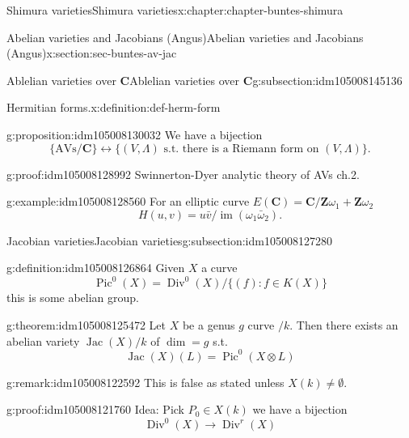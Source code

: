 \documentclass[oneside,10pt,]{book}
\numberwithin{equation}{section}
\newcommand{\ZZ}{\mathbf{Z}}
\newcommand{\CC}{\mathbf{C}}
\DeclareMathOperator{\divisors}{Div}
\DeclareMathOperator{\Pic}{Pic}
\DeclareMathOperator{\Jac}{Jac}
\DeclareMathOperator{\im}{im}
\begin{document}
\begin{chapterptx}{Shimura varieties}{}{Shimura varieties}{}{}{x:chapter:chapter-buntes-shimura}
\begin{sectionptx}{Abelian varieties and Jacobians (Angus)}{}{Abelian varieties and Jacobians (Angus)}{}{}{x:section:sec-buntes-av-jac}
\begin{subsectionptx}{Ablelian varieties over \(\CC\)}{}{Ablelian varieties over \(\CC\)}{}{}{g:subsection:idm105008145136}
\begin{definition}{Hermitian forms.}{x:definition:def-herm-form}
\end{definition}
\begin{proposition}{}{}{g:proposition:idm105008130032}%
We have a bijection%
\begin{equation*}
\{\text{AVs}/\CC\} \leftrightarrow \{(V,\Lambda)\text{ s.t. there is a Riemann form on } (V, \Lambda)\}\text{.}
\end{equation*}
%
\end{proposition}
\begin{proofptx}{}{g:proof:idm105008128992}
Swinnerton-Dyer analytic theory of AVs ch.2.%
\end{proofptx}
\begin{example}{}{g:example:idm105008128560}%
For an elliptic curve \(E(\CC) = \CC/ \ZZ \omega_1 + \ZZ \omega_2\)%
\begin{equation*}
H(u,v) = u\bar v/ \im(\omega_1 \bar \omega_2)\text{.}
\end{equation*}
%
\end{example}
\end{subsectionptx}
%
%
\typeout{************************************************}
\typeout{************************************************}
%
\begin{subsectionptx}{Jacobian varieties}{}{Jacobian varieties}{}{}{g:subsection:idm105008127280}
\begin{definition}{}{g:definition:idm105008126864}%
Given \(X\) a curve%
\begin{equation*}
\Pic^0(X) = \divisors^0(X)/\{(f) : f \in K(X)\}
\end{equation*}
this is some abelian group.%
\end{definition}
\begin{theorem}{}{}{g:theorem:idm105008125472}%
Let \(X\) be a genus \(g\) curve \(/k\). Then there exists an abelian variety \(\Jac(X)/k\) of \(\dim = g\) s.t.%
\begin{equation*}
\Jac(X)(L) = \Pic^0(X\otimes L)
\end{equation*}
%
\end{theorem}
\begin{remark}{}{g:remark:idm105008122592}%
This is false as stated unless \(X(k) \ne \emptyset\).%
\end{remark}
\begin{proofptx}{}{g:proof:idm105008121760}
Idea: Pick \(P_0 \in X(k)\) we have a bijection%
\begin{equation*}
\divisors^0(X) \to \divisors^r(X)
\end{equation*}

\end{proofptx}
\end{subsectionptx}
\end{sectionptx}
\end{chapterptx}
\end{document}
